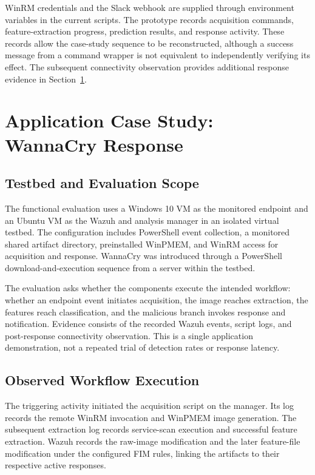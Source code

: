 \documentclass[conference]{IEEEtran}
\begin{document}
WinRM credentials and the Slack webhook are supplied through environment variables in the current scripts. The prototype records acquisition commands, feature-extraction progress, prediction results, and response activity. These records allow the case-study sequence to be reconstructed, although a success message from a command wrapper is not equivalent to independently verifying its effect. The subsequent connectivity observation provides additional response evidence in Section~\ref{sec:case}.

\section{Application Case Study: WannaCry Response}
\label{sec:case}

\subsection{Testbed and Evaluation Scope}
The functional evaluation uses a Windows 10 VM as the monitored endpoint and an Ubuntu VM as the Wazuh and analysis manager in an isolated virtual testbed. The configuration includes PowerShell event collection, a monitored shared artifact directory, preinstalled WinPMEM, and WinRM access for acquisition and response. WannaCry was introduced through a PowerShell download-and-execution sequence from a server within the testbed.

The evaluation asks whether the components execute the intended workflow: whether an endpoint event initiates acquisition, the image reaches extraction, the features reach classification, and the malicious branch invokes response and notification. Evidence consists of the recorded Wazuh events, script logs, and post-response connectivity observation. This is a single application demonstration, not a repeated trial of detection rates or response latency.

\subsection{Observed Workflow Execution}
The triggering activity initiated the acquisition script on the manager. Its log records the remote WinRM invocation and WinPMEM image generation. The subsequent extraction log records service-scan execution and successful feature extraction. Wazuh records the raw-image modification and the later feature-file modification under the configured FIM rules, linking the artifacts to their respective active responses.
\end{document}
